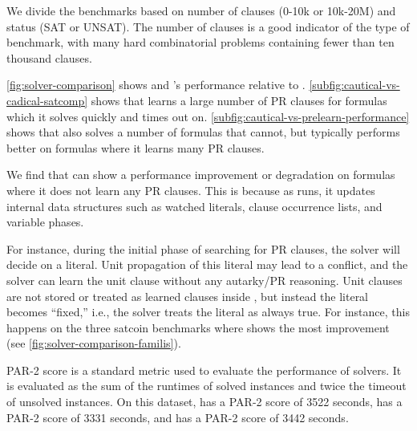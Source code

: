 We divide the benchmarks based on number of clauses (0-10k or 10k-20M) and
status (SAT or UNSAT). The number of clauses is a good indicator of the type of
benchmark, with many hard combinatorial problems containing fewer than ten
thousand clauses.

\autoref{fig:solver-comparison} shows \tool and \cadical's performance relative
to \cadical.
\autoref{subfig:cautical-vs-cadical-satcomp} shows that \tool learns a large
number of PR clauses for formulas which it solves quickly and \cadical times
out on. \autoref{subfig:cautical-vs-prelearn-performance} shows that \prelearn
also solves a number of formulas that \tool cannot, but \tool typically performs
better on formulas where it learns many PR clauses.

We find that \tool can show a performance improvement or degradation on formulas
where it does not learn any PR clauses. This is because as \tool runs, it
updates internal data structures such as watched literals, clause occurrence
lists, and variable phases. 

For instance, during the initial phase of searching for PR clauses, the solver
will decide on a literal. Unit propagation of this literal may lead to a
conflict, and the solver can learn the unit clause without any autarky/PR
reasoning. Unit clauses are not stored or treated as learned clauses inside
\cadical, but instead the literal becomes “fixed,” i.e., the solver treats the
literal as always true. For instance, this happens on the three satcoin
benchmarks where \tool shows the most improvement (see
\autoref{fig:solver-comparison-familis}).


PAR-2 score is a standard metric used to evaluate the performance of solvers. It
is evaluated as the sum of the runtimes of solved instances and twice the
timeout of unsolved instances. On this dataset, \cadical has a PAR-2 score of
3522 seconds, \prelearn has a PAR-2 score of 3331 seconds, and \tool has a PAR-2
score of 3442 seconds. 

